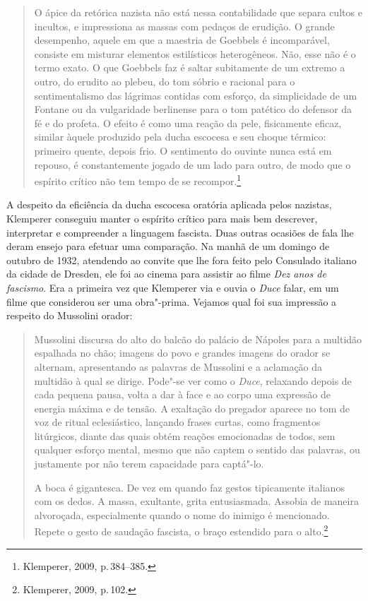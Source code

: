 \begin{quote}
O ápice da retórica nazista não está nessa contabilidade que separa
cultos e incultos, e impressiona as massas com pedaços de erudição. O
grande desempenho, aquele em que a maestria de Goebbels é incomparável,
consiste em misturar elementos estilísticos heterogêneos. Não, esse não
é o termo exato. O que Goebbels faz é saltar subitamente de um extremo a
outro, do erudito ao plebeu, do tom sóbrio e racional para o
sentimentalismo das lágrimas contidas com esforço, da simplicidade de um
Fontane ou da vulgaridade berlinense para o tom patético do defensor da
fé e do profeta. O efeito é como uma reação da pele, fisicamente eficaz,
similar àquele produzido pela ducha escocesa e seu choque térmico:
primeiro quente, depois frio. O sentimento do ouvinte nunca está em
repouso, é constantemente jogado de um lado para outro, de modo que o
espírito crítico não tem tempo de se recompor.\footnote{Klemperer, 2009,
  p.\,384--385.}
\end{quote}

A despeito da eficiência da ducha escocesa oratória aplicada pelos
nazistas, Klemperer conseguiu manter o espírito crítico para mais bem
descrever, interpretar e compreender a linguagem fascista. Duas outras
ocasiões de fala lhe deram ensejo para efetuar uma comparação. Na manhã
de um domingo de outubro de 1932, atendendo ao convite que lhe fora
feito pelo Consulado italiano da cidade de Dresden, ele foi ao cinema
para assistir ao filme \emph{Dez anos de fascismo}. Era a primeira vez
que Klemperer via e ouvia o \emph{Duce} falar, em um filme que
considerou ser uma obra"-prima. Vejamos qual foi sua impressão a respeito
do Mussolini orador:

\begin{quote}
Mussolini discursa do alto do balcão do palácio de Nápoles para a
multidão espalhada no chão; imagens do povo e grandes imagens do orador
se alternam, apresentando as palavras de Mussolini e a aclamação da
multidão à qual se dirige. Pode"-se ver como o \emph{Duce}, relaxando
depois de cada pequena pausa, volta a dar à face e ao corpo uma
expressão de energia máxima e de tensão. A exaltação do pregador aparece
no tom de voz de ritual eclesiástico, lançando frases curtas, como
fragmentos litúrgicos, diante das quais obtém reações emocionadas de
todos, sem qualquer esforço mental, mesmo que não captem o sentido das
palavras, ou justamente por não terem capacidade para captá"-lo.

A boca é gigantesca. De vez em quando faz gestos tipicamente italianos
com os dedos. A massa, exultante, grita entusiasmada. Assobia de maneira
alvoroçada, especialmente quando o nome do inimigo é mencionado. Repete
o gesto de saudação fascista, o braço estendido para o alto.\footnote{Klemperer,
  2009, p.\,102.}
\end{quote}

